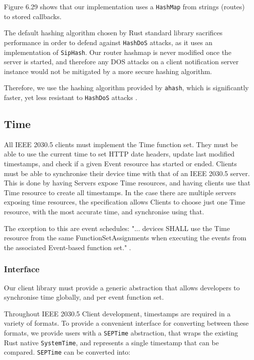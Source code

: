 Figure 6.29 shows that our implementation uses a \texttt{HashMap} from strings (routes) to stored callbacks. 

The default hashing algorithm chosen by Rust standard library sacrifices performance in order to defend against \texttt{HashDoS} attacks, as it uses an implementation of \texttt{SipHash}. Our router hashmap is never modified once the server is started, and therefore any DOS attacks on a client notification server instance would not be mitigated by a more secure hashing algorithm.

Therefore, we use the hashing algorithm provided by \texttt{ahash}, which is significantly faster, yet less resistant to \texttt{HashDoS} attacks \cite{ahash} \cite{hashbrown}.

\subsection{Time}
All IEEE 2030.5 clients must implement the Time function set. They must be able to use the current time to set HTTP date headers, update last modified timestamps, and check if a given Event resource has started or ended. Clients must be able to synchronise their device time with that of an IEEE 2030.5 server. This is done by having Servers expose Time resources, and having clients use that Time resource to create all timestamps. In the case there are multiple servers exposing time resources, the specification allows Clients to choose just one Time resource, with the most accurate time, and synchronise using that.

The exception to this are event schedules: "... devices SHALL use the Time resource from the same FunctionSetAssignments when executing the events from the associated Event-based function set." \cite{IEEE2030.5}.

\subsubsection{Interface}
Our client library must provide a generic abstraction that allows developers to synchronise time globally, and per event function set.

Throughout IEEE 2030.5 Client development, timestamps are required in a variety of formats. To provide a convenient interface for converting between these formats, we provide users with a \texttt{SEPTime} abstraction, that wraps the existing Rust native \texttt{SystemTime}, and represents a single timestamp that can be compared. \texttt{SEPTime} can be converted into:


